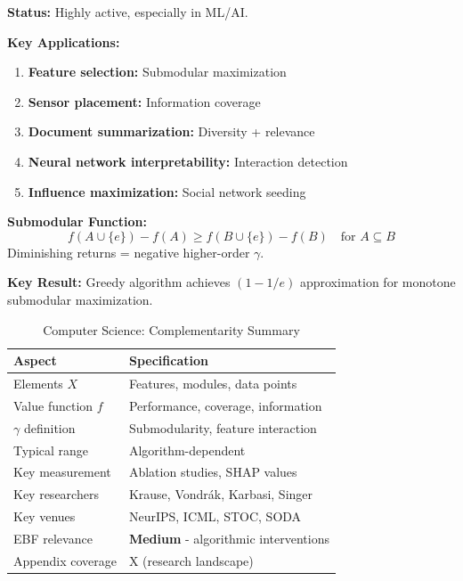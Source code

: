 \begin{tcolorbox}[colback=blue!5!white,colframe=blue!75!black,title=\textbf{Computer Science: Submodularity and Feature Interactions}]

\textbf{Status:} Highly active, especially in ML/AI.

\textbf{Key Applications:}
\begin{enumerate}[noitemsep]
    \item \textbf{Feature selection:} Submodular maximization
    \item \textbf{Sensor placement:} Information coverage
    \item \textbf{Document summarization:} Diversity + relevance
    \item \textbf{Neural network interpretability:} Interaction detection
    \item \textbf{Influence maximization:} Social network seeding
\end{enumerate}

\textbf{Submodular Function:}
\begin{equation}
f(A \cup \{e\}) - f(A) \geq f(B \cup \{e\}) - f(B) \quad \text{for } A \subseteq B
\end{equation}
Diminishing returns = negative higher-order $\gamma$.

\textbf{Key Result:}
Greedy algorithm achieves $(1 - 1/e)$ approximation for monotone submodular maximization.

\end{tcolorbox}

\begin{table}[h]
\centering
\caption{Computer Science: Complementarity Summary}
\label{tab:cs-summary}
\renewcommand{\arraystretch}{1.3}
\small
\begin{tabular}{@{}ll@{}}
\toprule
\textbf{Aspect} & \textbf{Specification} \\
\midrule
Elements $X$ & Features, modules, data points \\
Value function $f$ & Performance, coverage, information \\
$\gamma$ definition & Submodularity, feature interaction \\
Typical range & Algorithm-dependent \\
Key measurement & Ablation studies, SHAP values \\
Key researchers & Krause, Vondrák, Karbasi, Singer \\
Key venues & NeurIPS, ICML, STOC, SODA \\
EBF relevance & \textbf{Medium} - algorithmic interventions \\
Appendix coverage & X (research landscape) \\
\bottomrule
\end{tabular}
\end{table}

